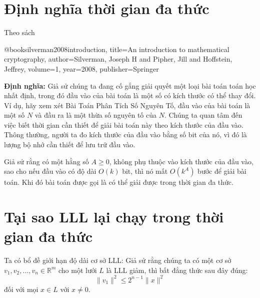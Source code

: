 \documentclass{article}
\begin{document}



\section{Định nghĩa thời gian đa thức}
 




Theo sách

@book{silverman2008introduction,
  title={An introduction to mathematical cryptography},
  author={Silverman, Joseph H and Pipher, Jill and Hoffstein, Jeffrey},
  volume={1},
  year={2008},
  publisher={Springer}
}





\textbf{Định nghĩa:} Giả sử chúng ta đang cố gắng giải quyết một loại bài toán toán học nhất định, trong đó đầu vào của bài toán là một số có kích thước có thể thay đổi. Ví dụ, hãy xem xét Bài Toán Phân Tích Số Nguyên Tố, đầu vào của bài toán là một số \( N \) và đầu ra là một thừa số nguyên tố của \( N \). Chúng ta quan tâm đến việc biết thời gian cần thiết để giải bài toán này theo kích thước của đầu vào. Thông thường, người ta đo kích thước của đầu vào bằng số bit của nó, vì đó là lượng bộ nhớ cần thiết để lưu trữ đầu vào.

Giả sử rằng có một hằng số \( A \geq 0 \), không phụ thuộc vào kích thước của đầu vào, sao cho nếu đầu vào có độ dài \( O(k) \) bit, thì nó mất \( O(k^A) \) bước để giải bài toán. Khi đó bài toán được gọi là có thể giải được trong thời gian đa thức.





\section{Tại sao LLL lại chạy trong thời gian đa thức}
Ta có  bổ đề  giới hạn độ dài cơ sở LLL:
Giả sử rằng chúng ta có một cơ sở \( v_1, v_2, \ldots, v_n \in \mathbb{R}^m \) cho một lưới \( L \) là LLL giảm, thì bất đẳng thức sau đây đúng:
\[ \|v_1\|^2 \leq 2^{n-1} \|x\|^2 \]
đối với mọi \( x \in L \) với \( x \neq 0 \).
\end{document}
